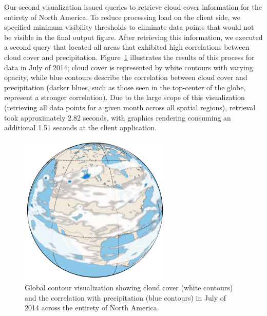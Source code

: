 Our second visualization issued queries to retrieve cloud cover information for the entirety of North America. To reduce processing load on the client side, we specified minimum visibility thresholds to eliminate data points that would not be visible in the final output figure. After retrieving this information, we executed a second query that located all areas that exhibited high correlations between cloud cover and precipitation. Figure~\ref{fig:global-contour} illustrates the results of this process for data in July of 2014; cloud cover is represented by white contours with varying opacity, while blue contours describe the correlation between cloud cover and precipitation (darker blues, such as those seen in the top-center of the globe, represent a stronger correlation). Due to the large scope of this visualization (retrieving all data points for a given month across all spatial regions), retrieval took approximately 2.82 seconds, with graphics rendering consuming an additional 1.51 seconds at the client application.

\begin{figure}[h]
    \centerline{\includegraphics[width=2.85in]{figures/globe.pdf}}
    \caption{Global contour visualization showing cloud cover (white contours) and the correlation with precipitation (blue contours) in July of 2014 across the entirety of North America.}
    \label{fig:global-contour}
\end{figure}



